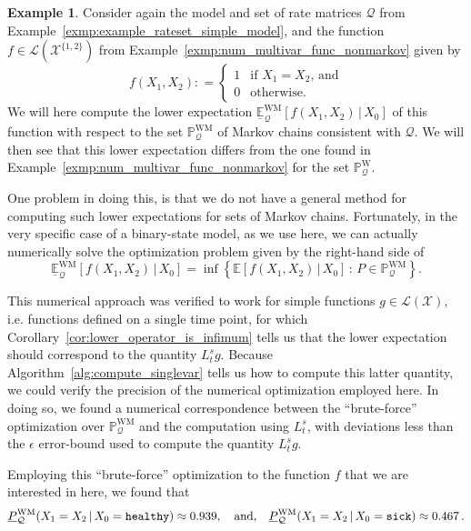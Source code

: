 \documentclass[10pt,a4paper]{paper}
\theoremstyle{definition}
\newtheorem{exmp}{Example}%
\newcommand{\states}{\mathcal{X}}
\newcommand{\processes}{\mathbb{P}}
\newcommand{\wprocesses}{\processes^{\mathrm{W}}}
\newcommand{\wmprocesses}{\processes^{\mathrm{WM}}}
\newcommand{\gambles}{\mathcal{L}}
\newcommand{\gamblesX}{\gambles(\states)}
\newcommand{\rateset}{\mathcal{Q}}
\newcommand{\coloneqq}{:\!=}
\begin{document}
\begin{exmp} \label{exmp:num_counterexample_markov}
Consider again the model and set of rate matrices $\rateset$ from Example~\ref{exmp:example_rateset_simple_model}, and the function $f\in\gambles(\states^{\{1,2\}})$ from Example~\ref{exmp:num_multivar_func_nonmarkov} given by
\begin{equation*}
f(X_1,X_2) \coloneqq \left\{\begin{array}{ll}
1 & \text{if $X_1 = X_2$, and} \\
0 & \text{otherwise.}
\end{array}\right.
\end{equation*}
We will here compute the lower expectation $\underline{\mathbb{E}}_\rateset^{\mathrm{WM}}[f(X_1,X_2)\,\vert\,X_0]$ of this function with respect to the set $\wmprocesses_\rateset$ of Markov chains consistent with $\rateset$. We will then see that this lower expectation differs from the one found in Example~\ref{exmp:num_multivar_func_nonmarkov} for the set $\wprocesses_\rateset$.

One problem in doing this, is that we do not have a general method for computing such lower expectations for sets of Markov chains. Fortunately, in the very specific case of a binary-state model, as we use here, we can actually numerically solve the optimization problem given by the right-hand side of
\begin{equation*}
\underline{\mathbb{E}}_\rateset^{\mathrm{WM}}[f(X_1,X_2)\,\vert\,X_0] = \inf\left\{ \mathbb{E}[f(X_1,X_2)\,\vert\,X_0]\,:\,P\in\wmprocesses_\rateset\right\}.
\end{equation*}

This numerical approach was verified to work for simple functions $g\in\gamblesX$, i.e. functions defined on a single time point, for which Corollary~\ref{cor:lower_operator_is_infimum} tells us that the lower expectation should correspond to the quantity $L_t^sg$. Because Algorithm~\ref{alg:compute_singlevar} tells us how to compute this latter quantity, we could verify the precision of the numerical optimization employed here. In doing so, we found a numerical correspondence between the ``brute-force'' optimization over $\wmprocesses_\rateset$ and the computation using $L_t^s$, with deviations less than the $\epsilon$ error-bound used to compute the quantity $L_t^sg$.

Employing this ``brute-force'' optimization to the function $f$ that we are interested in here, we found that
\begin{align*}
\underline{P}_{\rateset}^{\mathrm{WM}}(X_1 = X_2\,\vert\,X_0=\text{{\tt healthy}}) \approx 0.939,\quad\text{and,}\quad \underline{P}_{\rateset}^{\mathrm{WM}}(X_1 = X_2\,\vert\,X_0=\text{{\tt sick}}) \approx 0.467\,.
\end{align*}


\end{exmp}
\end{document}
